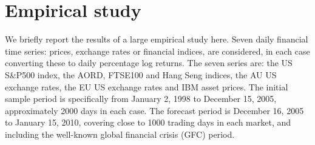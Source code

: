 \documentclass[12pt,epsf]{article}
\begin{document}
%



\section{Empirical study}
We briefly report the results of a large empirical study here. Seven daily financial time series: prices, exchange rates or
financial indices, are considered, in each case converting these to daily percentage log returns. The seven series are: the US
S\&P500 index, the AORD, FTSE100 and Hang Seng indices, the AU US exchange rates, the EU US exchange rates and IBM asset prices.
The initial sample period is specifically from January 2, 1998 to December 15, 2005, approximately 2000 days in each case. The forecast
period is December 16, 2005 to January 15, 2010, covering close to 1000 trading days in each market, and including the well-known
global financial crisis (GFC) period.
\end{document}
